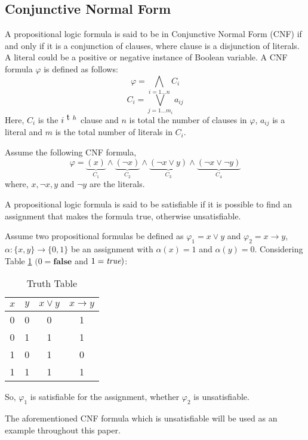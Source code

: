 \subsection{Conjunctive Normal Form}
A propositional logic formula is said to be in Conjunctive Normal Form (CNF) if and only if it is a conjunction of clauses, where clause is a disjunction of literals. A literal could be a positive or negative instance of Boolean variable. A CNF formula $\varphi$ is defined as follows:
$$\varphi = \bigwedge\limits_{i=1\ldots n} C_{i}$$
$$ C_{i} = \bigvee\limits_{j=1\ldots m_{i}} a_{ij}$$
Here, $C_{i}$ is the $i^{\text th}$ clause and $n$ is total the number of clauses in $\varphi$, $a_{ij}$ is a literal and $m$ is the total number of literals in $C_{i}$.\newline
\begin{example}
	\label{cnf}
	Assume the following CNF formula,
	$$\varphi=\underbrace{(x)}\limits_{C_{1}}\wedge\underbrace{(\neg x)}\limits_{C_2}\wedge\underbrace{(\neg x\vee y)}\limits_{C_{3}}\wedge\underbrace{(\neg x \vee \neg y)}\limits_{C_{4}}$$
	where, $x, \neg x, y$ and $\neg y$ are the literals.
\end{example}
A propositional logic formula is said to be satisfiable if it is possible to find an assignment that makes the formula true, otherwise unsatisfiable.
\begin{example}
	Assume two propositional formulas be defined as $\varphi_{1}=x\vee y$ and $\varphi_{2}=x\rightarrow y$, $\alpha : \{x, y\}\rightarrow \{0, 1\}$ be an assignment with $\alpha (x)=1$ and $\alpha (y)=0$. Considering Table \ref{truth-table} $(0=\mathbf{false}$ and $1=\emph{true})$:
	\begin{table}[]
		\centering
		\caption{Truth Table}
		\label{truth-table}
		\begin{tabular}{|c|c|c|c|}
			\hline
			$x$ & $y$ & $x \vee y$ & $x\rightarrow y$ \\ \hline
			0   & 0   & 0          & 1                \\ \hline
			0   & 1   & 1          & 1                \\ \hline
			1   & 0   & 1          & 0                \\ \hline
			1   & 1   & 1          & 1                \\ \hline
		\end{tabular}
	\end{table}
	So, $\varphi_{1}$ is satisfiable for the assignment, whether $\varphi_{2}$ is unsatisfiable.
\end{example}
The aforementioned CNF formula which is unsatisfiable will be used as an example throughout this paper.
